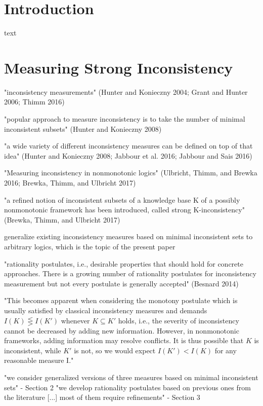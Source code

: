 \section{Introduction}
text

\section{Measuring Strong Inconsistency}
\cite{ulbricht_measuring_2018}

"inconsistency measurements"
(Hunter and Konieczny 2004; Grant and Hunter 2006; Thimm 2016)
\cite{bertossi_approaches_2005} \cite{grant_measuring_2006}

"popular approach to measure inconsistency is to take the number of minimal inconsistent subsets"
(Hunter and Konieczny 2008)
\cite{hunter_measuring_2008}

"a wide variety of different inconsistency measures can be defined on top of that idea"
(Hunter and Konieczny 2008; Jabbour et al. 2016; Jabbour and Sais 2016)
\cite{hunter_measuring_2008} \cite{jabbour_mis_2016}

"Measuring inconsistency in nonmonotonic logics"
(Ulbricht, Thimm, and Brewka 2016; Brewka, Thimm, and Ulbricht 2017)
\cite{michael_measuring_2016} \cite{brewka_strong_2017}

"a refined notion of inconsistent subsets of a knowledge base K of a possibly nonmonotonic framework has been introduced, called strong K-inconsistency"
(Brewka, Thimm, and Ulbricht 2017)
\cite{brewka_strong_2017}

generalize existing inconsistency measures based on minimal inconsistent sets to arbitrary logics, which is the topic of the present paper
\cite{ulbricht_measuring_2018}

"rationality postulates, i.e., desirable properties that should hold for concrete approaches. There is a growing number of rationality postulates for inconsistency measurement but not every postulate is generally accepted"
(Besnard 2014)
\cite{ferme_revisiting_2014}

"This becomes apparent when considering the monotony postulate which is usually satisfied by classical inconsistency measures and demands \(I(K) \lesseqgtr I(K')\) whenever \(K \subseteq K'\) holds, i.e., the severity of inconsistency cannot be decreased by adding new information. However, in nonmonotonic frameworks, adding information may resolve conflicts. It is thus possible that \(K\) is inconsistent, while \(K'\) is not, so we would expect \(I(K') < I(K)\) for any reasonable measure I."
\cite{ulbricht_measuring_2018}

"we consider generalized versions of three measures based on minimal inconsistent sets" - Section 2
"we develop rationality postulates based on previous ones from the literature [...] most of them require refinements" - Section 3
\cite{ulbricht_measuring_2018}
